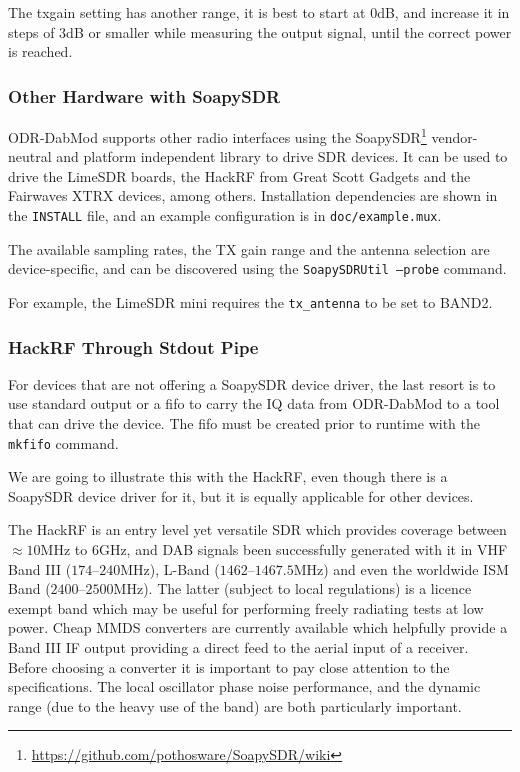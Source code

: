The txgain setting has another range, it is best to start at $0$dB, and increase
it in steps of $3$dB or smaller while measuring the output signal, until the
correct power is reached.

\subsubsection{Other Hardware with SoapySDR}
\label{otherhardware}
ODR-DabMod supports other radio interfaces using the
SoapySDR\footnote{\url{https://github.com/pothosware/SoapySDR/wiki}}
vendor-neutral and platform independent library to drive SDR devices. It can be
used to drive the LimeSDR boards, the HackRF from Great Scott Gadgets and the
Fairwaves XTRX devices, among others. Installation dependencies are shown in the
\texttt{INSTALL} file, and an example configuration is in
\texttt{doc/example.mux}.

The available sampling rates, the TX gain range and the antenna selection are
device-specific, and can be discovered using the \texttt{SoapySDRUtil --probe}
command.

For example, the LimeSDR mini requires the \verb+tx_antenna+ to be set to
BAND2.

\subsubsection{HackRF Through Stdout Pipe}
For devices that are not offering a SoapySDR device driver, the last resort is
to use standard output or a fifo to carry the IQ data from ODR-DabMod to a tool
that can drive the device.
The fifo must be created prior to runtime with the \texttt{mkfifo} command.

We are going to illustrate this with the HackRF, even though there is a SoapySDR
device driver for it, but it is equally applicable for other devices.

The HackRF is an entry level yet versatile SDR which provides coverage between
$\approx10$MHz to $6$GHz, and DAB signals been successfully generated with it in
VHF Band III ($174$--$240$MHz), L-Band ($1462$--$1467.5$MHz) and even the worldwide ISM
Band ($2400$--$2500$MHz). The latter (subject to local regulations) is a licence exempt
band which may be useful for performing freely radiating tests at low power. Cheap
MMDS converters are currently available which helpfully provide a Band III IF output
providing a direct feed to the aerial input of a receiver. Before choosing a converter
it is important to pay close attention to the specifications. The local oscillator
phase noise performance, and the dynamic range (due to the heavy use of the band) are
both particularly important.

